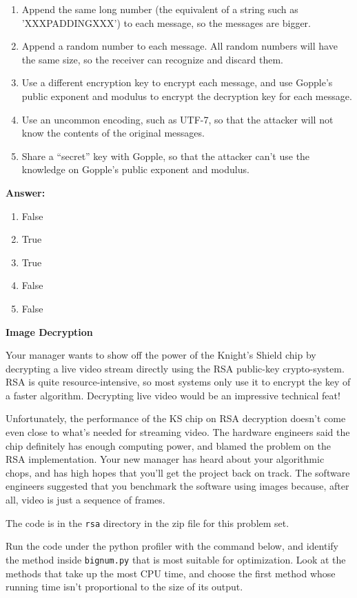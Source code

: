 \documentclass[12pt,twoside]{article}
\newcommand{\answer}{
 \par\medskip
 \textbf{Answer:}
}
\newcommand{\answerIIf}{ \answer
\begin{enumerate}
	\item False
	\item True
	\item True
	\item False
	\item False
	
\end{enumerate}
}
\begin{document}
\begin{problems}
\begin {problemparts}
\begin{enumerate}
  \item Append the same long number (the equivalent of a string such as
  'XXXPADDINGXXX') to each message, so the messages are bigger.
  \item Append a random number to each message. All random numbers will have the
  same size, so the receiver can recognize and discard them.
  \item Use a different encryption key to encrypt each message, and use Gopple's
  public exponent and modulus to encrypt the decryption key for each message.
  \item Use an uncommon encoding, such as UTF-7, so that the attacker will not
  know the contents of the original messages.
  \item Share a ``secret'' key with Gopple, so that the attacker can't use the
  knowledge on Gopple's public exponent and modulus.
\end{enumerate}
\answerIIf

\end{problemparts}

\newpage

\problem {} \textbf{Image Decryption}

Your manager wants to show off the power of the Knight's Shield chip by
decrypting a live video stream directly using the RSA public-key crypto-system.
RSA is quite resource-intensive, so most systems only use it to encrypt the key
of a faster algorithm. Decrypting live video would be an impressive technical
feat!

Unfortunately, the performance of the KS chip on RSA decryption doesn't come
even close to what's needed for streaming video. The hardware engineers said the
chip definitely has enough computing power, and blamed the problem on the
RSA implementation. Your new manager has heard about your algorithmic chops, and
has high hopes that you'll get the project back on track. The software engineers
suggested that you benchmark the software using images because, after all, video
is just a sequence of frames.

The code is in the \texttt{rsa} directory in the zip file for this problem set.

\begin{problemparts}
\problempart {} Run the code under the python profiler with the command
below, and identify the method inside \texttt{bignum.py} that is most suitable
for optimization. Look at the methods that take up the most CPU time, and
choose the first method whose running time isn't proportional to the size of its
output.


\end{problemparts}
\end{problems}
\end{document}
